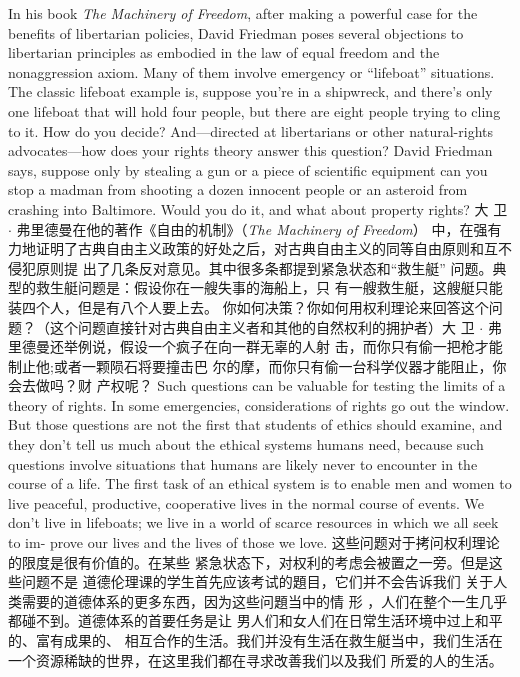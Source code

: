 \begin{paracol}{2}
In his book \textit{The Machinery of Freedom}, after making a powerful
case for the benefits of libertarian policies, David Friedman
poses several objections to libertarian principles as embodied in
the law of equal freedom and the nonaggression axiom. Many
of them involve emergency or ``lifeboat'' situations. The classic
lifeboat example is, suppose you're in a shipwreck, and there's
only one lifeboat that will hold four people, but there are eight
people trying to cling to it. How do you decide? And---directed
at libertarians or other natural-rights advocates---how does
your rights theory answer this question? David Friedman says,
suppose only by stealing a gun or a piece of scientific equipment
can you stop a madman from shooting a dozen innocent people
or an asteroid from crashing into Baltimore. Would you do it,
and what about property rights?
\switchcolumn
大 卫 $\cdot$ 弗里德曼在他的著作《自由的机制》（\textit{The  Machinery of Freedom}） 中，在强有力地证明了古典自由主义政策的好处之后，对古典自由主义的同等自由原则和互不侵犯原则提
出了几条反对意见。其中很多条都提到紧急状态和“救生艇”
问题。典型的救生艇问题是：假设你在一艘失事的海船上，只
有一艘救生艇，这艘艇只能装四个人，但是有八个人要上去。
你如何决策？你如何用权利理论来回答这个问题？（这个问题直接针对古典自由主义者和其他的自然权利的拥护者）大
卫 $\cdot$ 弗里德曼还举例说，假设一个疯子在向一群无辜的人射
击，而你只有偷一把枪才能制止他;或者一颗陨石将要撞击巴
尔的摩，而你只有偷一台科学仪器才能阻止，你会去做吗？财
产权呢？ 
\switchcolumn*
Such questions can be valuable for testing the limits of a theory of rights. In some emergencies, considerations of rights go
out the window. But those questions are not the first that students of ethics should examine, and they don't tell us much
about the ethical systems humans need, because such questions
involve situations that humans are likely never to encounter in
the course of a life. The first task of an ethical system is to enable men and women to live peaceful, productive, cooperative
lives in the normal course of events. We don't live in lifeboats;
we live in a world of scarce resources in which we all seek to im-
prove our lives and the lives of those we love.
\switchcolumn
这些问题对于拷问权利理论的限度是很有价值的。在某些
紧急状态下，对权利的考虑会被置之一旁。但是这些问题不是
道德伦理课的学生首先应该考试的題目，它们并不会告诉我们
关于人类需要的道德体系的更多东西，因为这些问題当中的情
形 ，人们在整个一生几乎都碰不到。道德体系的首要任务是让
男人们和女人们在日常生活环境中过上和平的、富有成果的、
相互合作的生活。我们并没有生活在救生艇当中，我们生活在
一个资源稀缺的世界，在这里我们都在寻求改善我们以及我们
所爱的人的生活。


\end{paracol}

